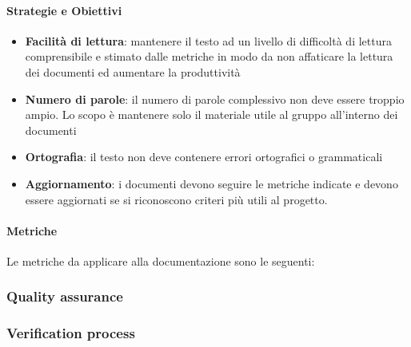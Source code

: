             \paragraph{Strategie e Obiettivi}
            \begin{itemize}
                \item \textbf{Facilità di lettura}: mantenere il testo ad un livello di difficoltà di lettura comprensibile e stimato dalle metriche in modo da non affaticare la lettura dei documenti ed aumentare la produttività
                \item \textbf{Numero di parole}: il numero di parole complessivo non deve essere troppio ampio. Lo scopo è mantenere solo il materiale utile al gruppo all'interno dei documenti
                \item \textbf{Ortografia}: il testo non deve contenere errori ortografici o grammaticali
                \item \textbf{Aggiornamento}: i documenti devono seguire le metriche indicate e devono essere aggiornati se si riconoscono criteri più utili al progetto.
            \end{itemize}
            
            \paragraph{Metriche}
            Le metriche da applicare alla documentazione sono le seguenti:
            
             \def\productquality{
                            {   Gunning's fog index,
                                $0.4*(\frac{ Parole}{Frasi} + 100* \frac{Complesse}{ Frasi})$, 
                                $ \geq 16$,
                                $ \geq 12 $
                            },
                            {   Gulpease index,
                                $89 + (300*Frasi - 10*\frac{Lettere}{Parole}$, 
                                $40 < IG \leq 100$,
                                $80 < IG \leq 100$
                            },
                            {   Correttezza ortografica,
                                numero totale di errori, 
                                0,
                                0
                            },
                        }

            
            \subsubsection{Quality assurance}
            \subsubsection{Verification process}

    